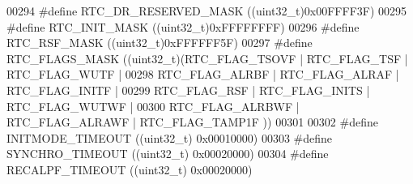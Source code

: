 \begin{DoxyCode}
00294 \textcolor{preprocessor}{#}\textcolor{preprocessor}{define} \textcolor{preprocessor}{RTC\_DR\_RESERVED\_MASK}    \textcolor{preprocessor}{(}\textcolor{preprocessor}{(}\textcolor{preprocessor}{uint32\_t}\textcolor{preprocessor}{)}0x00FFFF3F\textcolor{preprocessor}{)}
00295 \textcolor{preprocessor}{#}\textcolor{preprocessor}{define} \textcolor{preprocessor}{RTC\_INIT\_MASK}           \textcolor{preprocessor}{(}\textcolor{preprocessor}{(}\textcolor{preprocessor}{uint32\_t}\textcolor{preprocessor}{)}0xFFFFFFFF\textcolor{preprocessor}{)}
00296 \textcolor{preprocessor}{#}\textcolor{preprocessor}{define} \textcolor{preprocessor}{RTC\_RSF\_MASK}            \textcolor{preprocessor}{(}\textcolor{preprocessor}{(}\textcolor{preprocessor}{uint32\_t}\textcolor{preprocessor}{)}0xFFFFFF5F\textcolor{preprocessor}{)}
00297 \textcolor{preprocessor}{#}\textcolor{preprocessor}{define} \textcolor{preprocessor}{RTC\_FLAGS\_MASK}          \textcolor{preprocessor}{(}\textcolor{preprocessor}{(}\textcolor{preprocessor}{uint32\_t}\textcolor{preprocessor}{)}\textcolor{preprocessor}{(}RTC_FLAG_TSOVF \textcolor{preprocessor}{|} RTC_FLAG_TSF \textcolor{preprocessor}{|} 
      RTC_FLAG_WUTF \textcolor{preprocessor}{|}
00298                                             RTC_FLAG_ALRBF \textcolor{preprocessor}{|} RTC_FLAG_ALRAF \textcolor{preprocessor}{|} 
      RTC_FLAG_INITF \textcolor{preprocessor}{|}
00299                                             RTC_FLAG_RSF \textcolor{preprocessor}{|} RTC_FLAG_INITS \textcolor{preprocessor}{|} 
      RTC_FLAG_WUTWF \textcolor{preprocessor}{|}
00300                                             RTC_FLAG_ALRBWF \textcolor{preprocessor}{|} 
      RTC_FLAG_ALRAWF \textcolor{preprocessor}{|} RTC_FLAG_TAMP1F \textcolor{preprocessor}{)}\textcolor{preprocessor}{)}
00301 
00302 \textcolor{preprocessor}{#}\textcolor{preprocessor}{define} \textcolor{preprocessor}{INITMODE\_TIMEOUT}         \textcolor{preprocessor}{(}\textcolor{preprocessor}{(}\textcolor{preprocessor}{uint32\_t}\textcolor{preprocessor}{)} 0x00010000\textcolor{preprocessor}{)}
00303 \textcolor{preprocessor}{#}\textcolor{preprocessor}{define} \textcolor{preprocessor}{SYNCHRO\_TIMEOUT}          \textcolor{preprocessor}{(}\textcolor{preprocessor}{(}\textcolor{preprocessor}{uint32\_t}\textcolor{preprocessor}{)} 0x00020000\textcolor{preprocessor}{)}
00304 \textcolor{preprocessor}{#}\textcolor{preprocessor}{define} \textcolor{preprocessor}{RECALPF\_TIMEOUT}          \textcolor{preprocessor}{(}\textcolor{preprocessor}{(}\textcolor{preprocessor}{uint32\_t}\textcolor{preprocessor}{)} 0x00020000\textcolor{preprocessor}{)}

\end{DoxyCode}
